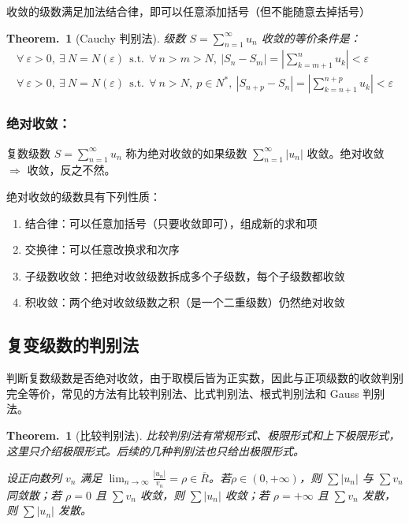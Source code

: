 \documentclass[UTF8]{report}
\theoremstyle{MyLineTheoremStyle} %
\theoremstyle{MyBlockTheoremStyle} %
\newtheorem{BlockTheorem}[LineTheorem]{Theorem.\,} %
\theoremstyle{MySubsubsectionStyle} %
\begin{document}
收敛的级数满足加法结合律，即可以任意添加括号（但不能随意去掉括号）

\begin{BlockTheorem}[Cauchy 判别法]\label{Cauchy 判别法}
    级数 $S = \sum_{n =1}^{\infty} u_n$ 收敛的等价条件是：
    \begin{gather}
    \forall\ \varepsilon > 0,\ \exists\ N = N(\varepsilon)\ \ \text{s.t.}\ \ \forall\ n > m > N,\ | S_{n} - S_m | =  \left| \sum_{k=m+1}^{n} u_k \right| < \varepsilon \\ 
    \forall\ \varepsilon > 0,\ \exists\ N = N(\varepsilon)\ \ \text{s.t.}\ \ \forall\ n > N,\ p \in N^*,\ | S_{n + p} - S_n | =  \left| \sum_{k=n+1}^{n+p} u_k \right| < \varepsilon
\end{gather}
\end{BlockTheorem}

\subsubsection{绝对收敛：}
复数级数 $\displaystyle S = \sum_{n = 1}^{\infty} u_n$ 称为绝对收敛的如果级数 $\displaystyle \sum_{n = 1}^{\infty} | u_n |$ 收敛。绝对收敛 $\Longrightarrow $ 收敛，反之不然。

绝对收敛的级数具有下列性质：
\begin{enumerate}
\item 结合律：可以任意加括号（只要收敛即可），组成新的求和项
\item 交换律：可以任意改换求和次序
\item 子级数收敛：把绝对收敛级数拆成多个子级数，每个子级数都收敛
\item 积收敛：两个绝对收敛级数之积（是一个二重级数）仍然绝对收敛
\end{enumerate}

\subsection{复变级数的判别法}

判断复数级数是否绝对收敛，由于取模后皆为正实数，因此与正项级数的收敛判别完全等价，常见的方法有比较判别法、比式判别法、根式判别法和 Gauss 判别法。

\begin{BlockTheorem}[比较判别法]\label{比较判别法}
比较判别法有常规形式、极限形式和上下极限形式，这里只介绍极限形式。后续的几种判别法也只给出极限形式。

设正向数列 $v_n$ 满足 $\displaystyle \lim_{n \to \infty} \frac{| u_n |}{v_n} = \rho \in \overline{R}$。若$\rho \in (0, +\infty)$，则 $\sum | u_n |$ 与 $\sum v_n$ 同敛散；若 $\rho = 0$ 且 $\sum v_n$ 收敛，则 $\sum | u_n |$ 收敛；若 $\rho = +\infty$ 且 $ \sum v_n$ 发散，则 $\sum | u_n |$ 发散。
\end{BlockTheorem}
\end{document}
